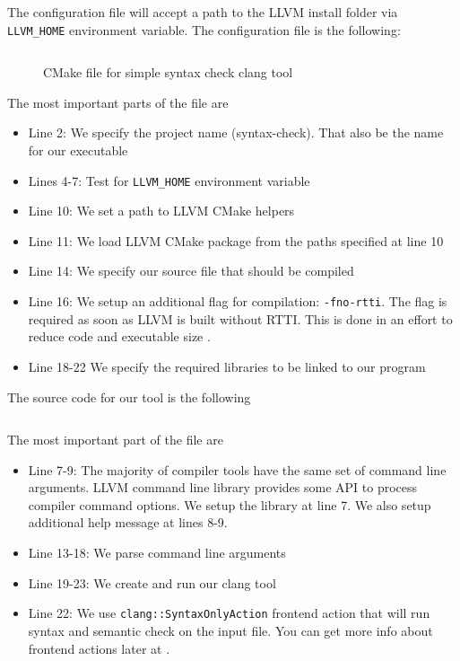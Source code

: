The configuration file will accept a path to the LLVM install folder via
\texttt{LLVM_HOME} environment variable. The configuration file is the
following:
\begin{figure}[H]
  \inputminted{cmake}{./src/part1/ch1_setup/syntaxcheck/CMakeLists.txt}
  \caption{CMake file for simple syntax check clang tool}
  \label{lis:cmake_sytax_check}
\end{figure}
The most important parts of the file are
\begin{itemize}
\item Line 2: We specify the project name (syntax-check). That also be the name
  for our executable 
\item Lines 4-7: Test for \texttt{LLVM_HOME} environment variable
\item Line 10: We set a path to LLVM CMake helpers
\item Line 11: We load LLVM CMake package from the paths specified at line 10
\item Line 14: We specify our source file that should be compiled
\item Line 16: We setup an additional flag for compilation:
  \texttt{-fno-rtti}. The flag is required as soon as LLVM is built without
  RTTI. This is done in an effort to reduce code and executable size
  \citep{llvm:coding_standards}.   
\item Line 18-22 We specify the required libraries to be linked to our
  program 
\end{itemize}

The source code for our tool is the following
\inputminted{c++}{./src/part1/ch1_setup/syntaxcheck/SyntaxCheck.cpp}
The most important part of the file are
\begin{itemize}
\item Line 7-9: The majority of compiler tools have the same set of command line
  arguments. LLVM command line library \citep{llvm:commandline_library}
  provides some API to process compiler command options. We setup the library
  at line 7. We also setup additional help message at lines 8-9. 
\item Line 13-18: We parse command line arguments
\item Line 19-23: We create and run our clang tool
\item Line 22: We use \texttt{clang::SyntaxOnlyAction} frontend action that
  will run syntax and semantic check on the input file. You can get more info
  about frontend actions later at .
\end{itemize}

